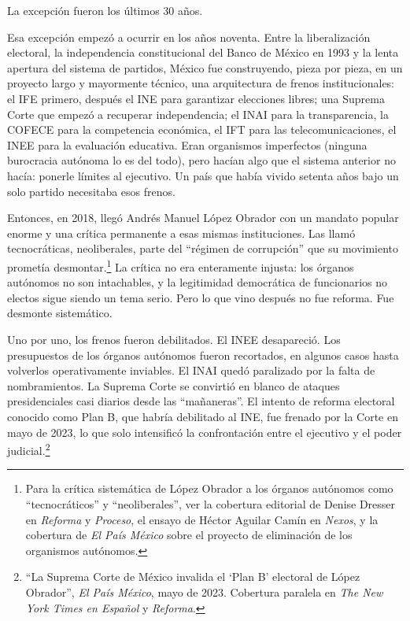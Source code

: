 \documentclass[11pt,letterpaper]{article}
\begin{document}
La excepción fueron los últimos 30 años.

Esa excepción empezó a ocurrir en los años noventa. Entre la liberalización electoral, la independencia constitucional del Banco de México en 1993 y la lenta apertura del sistema de partidos, México fue construyendo, pieza por pieza, en un proyecto largo y mayormente técnico, una arquitectura de frenos institucionales: el IFE primero, después el INE para garantizar elecciones libres; una Suprema Corte que empezó a recuperar independencia; el INAI para la transparencia, la COFECE para la competencia económica, el IFT para las telecomunicaciones, el INEE para la evaluación educativa. Eran organismos imperfectos (ninguna burocracia autónoma lo es del todo), pero hacían algo que el sistema anterior no hacía: ponerle límites al ejecutivo. Un país que había vivido setenta años bajo un solo partido necesitaba esos frenos.

Entonces, en 2018, llegó Andrés Manuel López Obrador con un mandato popular enorme y una crítica permanente a esas mismas instituciones. Las llamó tecnocráticas, neoliberales, parte del ``régimen de corrupción'' que su movimiento prometía desmontar.\footnote{Para la crítica sistemática de López Obrador a los órganos autónomos como ``tecnocráticos'' y ``neoliberales'', ver la cobertura editorial de Denise Dresser en \textit{Reforma} y \textit{Proceso}, el ensayo de Héctor Aguilar Camín en \textit{Nexos}, y la cobertura de \textit{El País México} sobre el proyecto de eliminación de los organismos autónomos.} La crítica no era enteramente injusta: los órganos autónomos no son intachables, y la legitimidad democrática de funcionarios no electos sigue siendo un tema serio. Pero lo que vino después no fue reforma. Fue desmonte sistemático.

Uno por uno, los frenos fueron debilitados. El INEE desapareció. Los presupuestos de los órganos autónomos fueron recortados, en algunos casos hasta volverlos operativamente inviables. El INAI quedó paralizado por la falta de nombramientos. La Suprema Corte se convirtió en blanco de ataques presidenciales casi diarios desde las ``mañaneras''. El intento de reforma electoral conocido como Plan B, que habría debilitado al INE, fue frenado por la Corte en mayo de 2023, lo que solo intensificó la confrontación entre el ejecutivo y el poder judicial.\footnote{``La Suprema Corte de México invalida el `Plan B' electoral de López Obrador'', \textit{El País México}, mayo de 2023. Cobertura paralela en \textit{The New York Times en Español} y \textit{Reforma}.}
\end{document}

